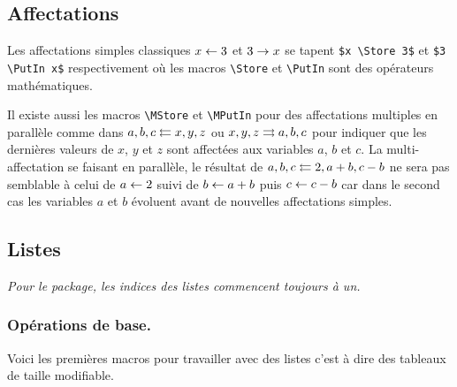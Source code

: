 \documentclass[12pt,a4paper]{article}
\theoremstyle{definition}
\newenvironment{frame-gene}[1][]{
	\begin{tcolorbox}[
		title        = #1, 
		colbacktitle = black!10!white, 
		colback      = white, 
		coltitle     = black,
		fonttitle    = \bfseries\itshape\small, 
		breakable,
		center title]
}{
	\end{tcolorbox}
}
\begin{document}

\subsection{Affectations}

Les affectations simples classiques $x \leftarrow 3$ et $3 \rightarrow x$ se tapent \verb+$x \Store 3$+ et \verb+$3 \PutIn x$+ respectivement où les macros \verb+\Store+ et \verb+\PutIn+ sont des opérateurs mathématiques.

\medskip

Il existe aussi les macros \verb+\MStore+ et \verb+\MPutIn+ pour des affectations multiples en parallèle comme dans $a, b, c \leftleftarrows x, y, z$ ou $x, y, z \rightrightarrows a, b, c$ pour indiquer que les dernières valeurs de $x$, $y$ et $z$ sont affectées aux variables $a$, $b$ et $c$.
La multi-affectation se faisant en parallèle, le résultat de $a, b, c \leftleftarrows 2, a + b, c - b$ ne sera pas semblable à celui de $a \leftarrow 2$ suivi de $b \leftarrow a + b$ puis $c \leftarrow c - b$ car dans le second cas les variables $a$ et $b$ évoluent avant de nouvelles affectations simples.





\subsection{Listes}

\begin{frame-gene}
	\centering\itshape
	Pour le package, les indices des listes commencent toujours à un. 
\end{frame-gene}


\subsubsection{Opérations de base.}

Voici les premières macros pour travailler avec des listes c'est à dire des tableaux de taille modifiable.
\end{document}
